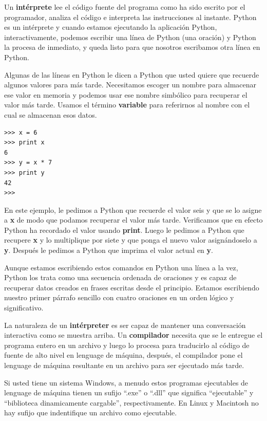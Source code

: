 Un {\bf int\'erprete} lee el c\'odigo fuente del programa como ha sido escrito por el
programador, analiza el c\'odigo e interpreta las instrucciones al instante.
Python es un int\'erprete y cuando estamos ejecutando la aplicaci\'on Python, interactivamente, 
podemos escribir una l\'inea de Python (una oraci\'on) y Python la procesa de inmediato,
y queda listo para que nosotros escribamos otra l\'inea en Python.   

Algunas de las l\'ineas en Python le dicen a Python que usted quiere que recuerde algunos valores para m\'as tarde. Necesitamos escoger un nombre para almacenar ese valor en memoria y podemos usar ese nombre simb\'olico para recuperar el valor m\'as tarde. Usamos el t\'ermino {\bf variable} para referirnos al nombre con el cual se almacenan esos datos.

\beforeverb
\begin{verbatim}
>>> x = 6
>>> print x
6
>>> y = x * 7
>>> print y
42
>>> 
\end{verbatim}
\afterverb
%
En este ejemplo, le pedimos a Python que recuerde el valor seis y que se lo asigne a {\bf x}
de modo que podamos recuperar el valor m\'as tarde. Verificamos que en efecto Python ha recordado el valor usando {\bf print}. Luego le pedimos a Python que recupere {\bf x} y lo multiplique por siete y que ponga el nuevo valor asign\'andoselo a {\bf y}. Despu\'es le pedimos a Python que imprima el valor actual en {\bf y}.

Aunque estamos escribiendo estos comandos en Python una l\'inea a la vez, Python
los trata como una secuencia ordenada de oraciones y es capaz de recuperar datos creados en frases escritas desde el principio. Estamos escribiendo nuestro primer p\'arrafo sencillo con cuatro oraciones en un orden l\'ogico y significativo.

La naturaleza de un {\bf int\'erpreter} es ser capaz de mantener una conversaci\'on interactiva como se muestra arriba. Un {\bf compilador} necesita que se le entregue el programa entero en un archivo y luego lo procesa para traducirlo al c\'odigo de fuente de alto nivel en lenguage de m\'aquina, despu\'es, el compilador pone el lenguage de m\'aquina resultante en un archivo para ser ejecutado m\'as tarde.

Si usted tiene un sistema Windows, a menudo estos programas ejecutables de lenguage de m\'aquina tienen un sufijo ``.exe'' o ``.dll'' que significa ``ejecutable'' y ``biblioteca dinamicamente cargable'', respectivamente. En Linux y Macintosh no hay sufijo que indentifique un archivo como ejecutable.

